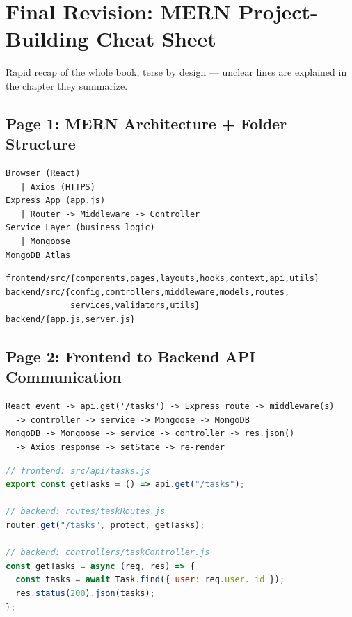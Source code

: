 \chapter*{Final Revision: MERN Project-Building Cheat Sheet}

\begin{notebox}[NOTE]
Rapid recap of the whole book, terse by design --- unclear lines are explained in the chapter they summarize.
\end{notebox}

\section*{Page 1: MERN Architecture + Folder Structure}

\begin{diagrambox}
\begin{verbatim}
Browser (React)
   | Axios (HTTPS)
Express App (app.js)
   | Router -> Middleware -> Controller
Service Layer (business logic)
   | Mongoose
MongoDB Atlas
\end{verbatim}
\end{diagrambox}

\begin{diagrambox}
\begin{verbatim}
frontend/src/{components,pages,layouts,hooks,context,api,utils}
backend/src/{config,controllers,middleware,models,routes,
             services,validators,utils}
backend/{app.js,server.js}
\end{verbatim}
\end{diagrambox}

\newpage
\section*{Page 2: Frontend to Backend API Communication}

\begin{diagrambox}
\begin{verbatim}
React event -> api.get('/tasks') -> Express route -> middleware(s)
  -> controller -> service -> Mongoose -> MongoDB
MongoDB -> Mongoose -> service -> controller -> res.json()
  -> Axios response -> setState -> re-render
\end{verbatim}
\end{diagrambox}

\begin{lstlisting}[language=JavaScript]
// frontend: src/api/tasks.js
export const getTasks = () => api.get("/tasks");

// backend: routes/taskRoutes.js
router.get("/tasks", protect, getTasks);

// backend: controllers/taskController.js
const getTasks = async (req, res) => {
  const tasks = await Task.find({ user: req.user._id });
  res.status(200).json(tasks);
};
\end{lstlisting}

